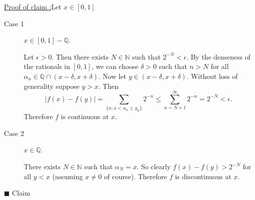 \documentclass[12pt]{article}
\newcounter{ProofCounter}
\newcounter{ClaimCounter}[ProofCounter]
\newenvironment{claim}[1]{\vspace{3mm}\stepcounter{ClaimCounter}\par\noindent\underline{\bf Claim \theClaimCounter:}\space#1}{}
\newenvironment{claimproof}[1]{\par\noindent\underline{Proof of claim \theClaimCounter:}\space#1}{\hfill $\blacksquare$ Claim \theClaimCounter}
\begin{document}
\begin{claimproof}
Let $x \in [0,1]$
\begin{description}
\item[Case 1] $x \in [0,1] - \mathbb{Q}$.

Let $\epsilon > 0$. Then there exists $N \in \mathbb{N}$ such that $2^{-N} < \epsilon$. By the denseness of the rationals in $[0,1]$, we can choose
$\delta > 0$ such that $n > N$ for all $\alpha_{n} \in \mathbb{Q} \cap (x - \delta, x + \delta)$. Now let $y \in (x - \delta, x + \delta)$. Without
loss of generality suppose $y > x$. Then 
\[ |f(x) - f(y)| = \sum_{\{n : x < \alpha_{n} \leq y_{n}\}} 2^{-n} \leq \sum_{n=N+1}^{\infty}2^{-n} = 2^{-N} < \epsilon. \]
Therefore $f$ is continuous at $x$.

\item[Case 2] $x \in \mathbb{Q}$.

There exists $N \in \mathbb{N}$ such that $\alpha_{N} = x$. So clearly $f(x) - f(y) > 2^{-N}$ for all $y < x$ (assuming $x \neq 0$ of course).
Therefore $f$ is discontinuous at $x$.
\end{description}
\end{claimproof}
\end{document}
